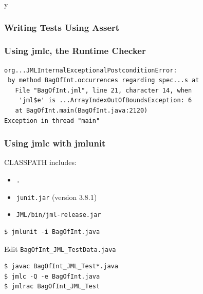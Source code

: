 \if y\MAKEHANDOUTS \documentclass[compress,landscape,handout]{beamer}
\begin{document}
\begin{frame}[fragile]
\frametitle{Writing Tests Using Assert}


\end{frame}

\begin{frame}[fragile]
\frametitle{Using jmlc, the Runtime Checker}

{\small
\begin{verbatim}
org...JMLInternalExceptionalPostconditionError:
 by method BagOfInt.occurrences regarding spec...s at
   File "BagOfInt.jml", line 21, character 14, when
    'jml$e' is ...ArrayIndexOutOfBoundsException: 6
   at BagOfInt.main(BagOfInt.java:2120)
Exception in thread "main" 
\end{verbatim}
}

\end{frame}

\begin{frame}[fragile]
\frametitle{Using jmlc with jmlunit}

\begin{example}
CLASSPATH includes:
\begin{itemize}
\item
\texttt{.}

\item
\texttt{junit.jar} (version 3.8.1)

\item
\texttt{JML/bin/jml-release.jar}
\end{itemize}

\begin{verbatim}
$ jmlunit -i BagOfInt.java
\end{verbatim}

Edit \lstinline!BagOfInt_JML_TestData.java!

\begin{verbatim}
$ javac BagOfInt_JML_Test*.java
$ jmlc -Q -e BagOfInt.java
$ jmlrac BagOfInt_JML_Test
\end{verbatim}
\end{example}
\end{frame}
\end{document}
